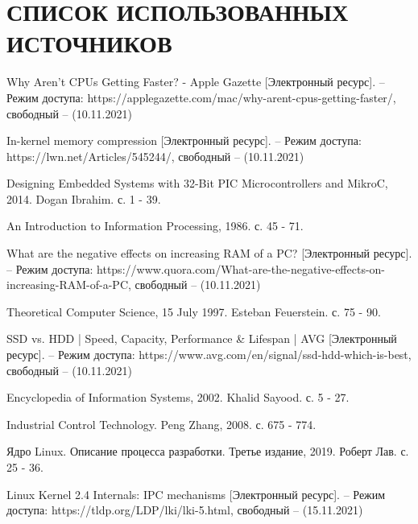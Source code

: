 \section*{СПИСОК ИСПОЛЬЗОВАННЫХ ИСТОЧНИКОВ}

\begingroup
\renewcommand{\section}[2]{}
\begin{thebibliography}{}
	Why Aren’t CPUs Getting Faster? - Apple Gazette [Электронный ресурс]. – Режим доступа: https://applegazette.com/mac/why-arent-cpus-getting-faster/,
	свободный – (10.11.2021)
	
	In-kernel memory compression [Электронный ресурс]. – Режим доступа: https://lwn.net/Articles/545244/, свободный – (10.11.2021)
	
	Designing Embedded Systems with 32-Bit PIC Microcontrollers and MikroC, 2014. Dogan Ibrahim. с. 1 - 39.
	
	An Introduction to Information Processing, 1986. с. 45 - 71.
	
	What are the negative effects on increasing RAM of a PC? [Электронный ресурс]. – Режим доступа: https://www.quora.com/What-are-the-negative-effects-on-increasing-RAM-of-a-PC, свободный – (10.11.2021)
	
	Theoretical Computer Science, 15 July 1997. Esteban Feuerstein. с. 75 - 90.
	
	SSD vs. HDD | Speed, Capacity, Performance \& Lifespan | AVG [Электронный ресурс]. – Режим доступа: https://www.avg.com/en/signal/ssd-hdd-which-is-best, свободный – (10.11.2021)
	
	Encyclopedia of Information Systems, 2002. Khalid Sayood. с. 5 - 27.
	
	Industrial Control Technology. Peng Zhang, 2008. с. 675 - 774.
	
	Ядро Linux. Описание процесса разработки. Третье издание, 2019. Роберт Лав. с. 25 - 36.
	
	Linux Kernel 2.4 Internals: IPC mechanisms [Электронный ресурс]. – Режим доступа: https://tldp.org/LDP/lki/lki-5.html, свободный – (15.11.2021)
	 

\end{thebibliography}
